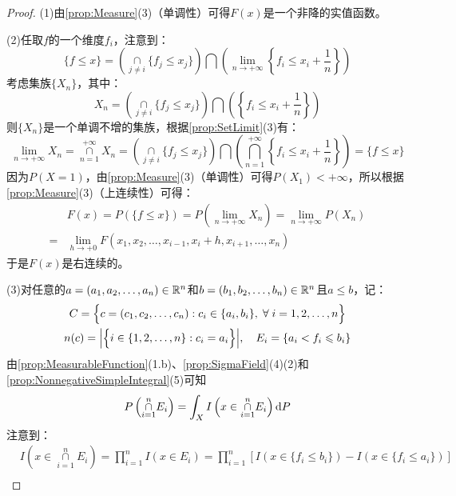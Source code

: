 \begin{proof}
	(1)由\cref{prop:Measure}(3)（单调性）可得$F(x)$是一个非降的实值函数。\par
	(2)任取$f$的一个维度$f_i$，注意到：
	\begin{equation*}
		\{f\leqslant x\}=\left(\underset{j\ne i}{\overset{}{\cap}}\{f_j\leqslant x_j\}\right)\bigcap\left(\lim_{n\to+\infty}\left\{f_i\leqslant x_i+\frac{1}{n}\right\}\right)
	\end{equation*}
	考虑集族$\{X_n\}$，其中：
	\begin{equation*}
		X_n=\left(\underset{j\ne i}{\overset{}{\cap}}\{f_j\leqslant x_j\}\right)\bigcap\left(\left\{f_i\leqslant x_i+\frac{1}{n}\right\}\right)
	\end{equation*}
	则$\{X_n\}$是一个单调不增的集族，根据\cref{prop:SetLimit}(3)有：
	\begin{equation*}
		\lim_{n\to+\infty}X_n=\underset{n=1}{\overset{+\infty}{\cap}}X_n=\left(\underset{j\ne i}{\overset{}{\cap}}\{f_j\leqslant x_j\}\right)\bigcap\left(\underset{n=1}{\overset{+\infty}{\bigcap}}\left\{f_i\leqslant x_i+\frac{1}{n}\right\}\right)=\{f\leqslant x\}
	\end{equation*}
	因为$P(X=1)$，由\cref{prop:Measure}(3)（单调性）可得$P(X_1)<+\infty$，所以根据\cref{prop:Measure}(3)（上连续性）可得：
	\begin{align*}
		&F(x)=P(\{f\leqslant x\})=P\left(\lim_{n\to+\infty}X_n\right)=\lim_{n\to+\infty}P(X_n) \\
		=&\lim_{h\to+0}F(x_1,x_2,\dots,x_{i-1},x_i+h,x_{i+1},\dots,x_n)
	\end{align*}
	于是$F(x)$是右连续的。\par
	(3)对任意的$a=(a_1, a_2, \dots, a_{n})\in\mathbb{R}^{n}$和$b=(b_1, b_2, \dots, b_{n})\in\mathbb{R}^{n}$且$a\leqslant b$，记：
	\begin{gather*}
		C=\Big\{c=(c_1, c_2, \dots, c_{n}):c_i\in\{a_i,b_i\},\;\forall\;i=1,2,\dots,n\Big\} \\
		n(c)=\Big|\Big\{i\in\{1,2,\dots,n\}:c_i=a_i\Big\}\Big|,\quad E_i=\{a_i<f_i\leqslant b_i\}
	\end{gather*}
	由\cref{prop:MeasurableFunction}(1.b)、\cref{prop:SigmaField}(4)(2)和\cref{prop:NonnegativeSimpleIntegral}(5)可知
	\begin{equation*}
		P\left(\underset{i=1}{\overset{n}{\cap}}E_i\right)=\int_{X}I\left(x\in\underset{i=1}{\overset{n}{\cap}}E_i\right)\mathop{}\!\mathrm{d} P
	\end{equation*}
	注意到：
	\begin{align*}
		&I\left(x\in\underset{i=1}{\overset{n}{\cap}}E_i\right)=\prod_{i=1}^{n}I(x\in E_i)=\prod_{i=1}^{n}[I(x\in\{f_i\leqslant b_i\})-I(x\in\{f_i\leqslant a_i\})] \\

\end{align*}
\end{proof}
